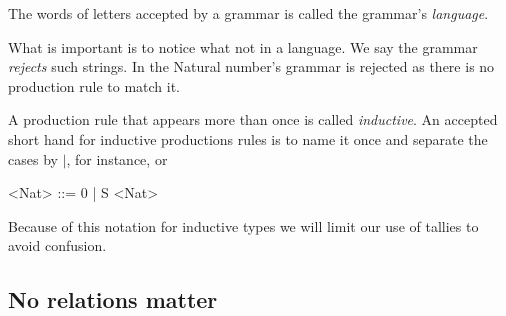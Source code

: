 \begin{definition}
    The words of letters accepted by a grammar is called the 
    grammar's \emph{language}.
\end{definition}

What is important is to notice what not in a language.  We 
say the grammar \emph{rejects} such strings.  In the Natural 
number's grammar  is rejected as there is no production 
rule to match it.


\begin{definition}
A production rule that appears more than once is called \emph{inductive}.
An accepted short hand for inductive productions rules is to name it once 
and separate the cases by $\mid$, for instance,
 or 
\begin{center}
\begin{gcode}[]
<Nat> ::= 0 
        | S <Nat>
\end{gcode}
\end{center}
\end{definition}


Because of this notation for inductive types we will limit our use of tallies
to avoid confusion.

    
\subsection{No relations matter}

